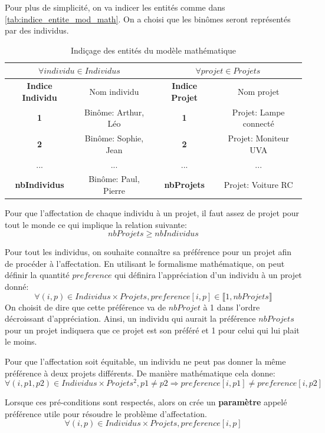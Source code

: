 \documentclass[final,poster]{polytech/polytech}
\begin{document}
Pour plus de simplicité, on va indicer les entités comme dans \autoref{tab:indice_entite_mod_math}. On a choisi que les binômes seront représentés par des individus.
\begin{table}
\caption{\label{tab:indice_entite_mod_math}Indiçage des entités du modèle mathématique}
\begin{tabular}{|c|c|c|c|}
\hline
\multicolumn{2}{|c|}{$\forall individu \in Individus$} & \multicolumn{2}{|c|}{$\forall projet \in Projets$} \\
\hline
\textbf{Indice Individu} & Nom individu &\textbf{ Indice Projet} & Nom projet \\
\hline
\textbf{1} & Binôme: Arthur, Léo & \textbf{1} & Projet: Lampe connecté \\
\hline
\textbf{2} & Binôme: Sophie, Jean & \textbf{2} & Projet: Moniteur UVA \\
\hline
... & ... & ... & ... \\
\hline
\textbf{nbIndividus} & Binôme: Paul, Pierre &\textbf{ nbProjets} & Projet: Voiture RC \\
\hline
\end{tabular}
\end{table}

Pour que l'affectation de chaque individu à un projet, il faut assez de projet pour tout le monde ce qui implique la relation suivante:
$$ nbProjets \geqslant nbIndividus$$

Pour tout les individus, on souhaite connaître sa préférence pour un projet afin de procéder à l'affectation. En utilisant le formalisme mathématique, on peut définir la quantité $preference$ qui définira l'appréciation d'un individu à un projet donné:
$$
\forall (i,p) \in Individus \times Projets,
preference[i,p] \in \llbracket 1, nbProjets \rrbracket
$$
On choisit de dire que cette préférence va de $nbProjet$ à 1 dans l'ordre décroissant d'appréciation. Ainsi, un individu qui aurait la préférence $nbProjets$ pour un projet indiquera que ce projet est son préféré et 1 pour celui qui lui plait le moins.

Pour que l'affectation soit équitable, un individu ne peut pas donner la même préférence à deux projets différents. De manière mathématique cela donne:
$$
\forall (i,p1,p2) \in Individus \times Projets^2 , p1 \neq p2 \Rightarrow preference[i,p1] \neq preference[i,p2]
$$

Lorsque ces pré-conditions sont respectés, alors on crée un \textbf{paramètre} appelé préférence utile pour résoudre le problème d'affectation.
$$
\forall (i,p) \in Individus \times Projets,
preference[i,p]
$$
\end{document}
